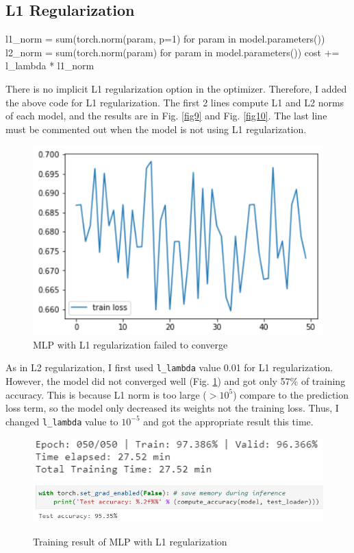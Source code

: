 \documentclass[11pt]{article}
\begin{document}
\subsection{L1 Regularization}\label{L1}
\begin{pythoncode*}{}
l1_norm = sum(torch.norm(param, p=1) for param in model.parameters())
l2_norm = sum(torch.norm(param) for param in model.parameters())
cost += l_lambda * l1_norm
\end{pythoncode*}
    There is no implicit L1 regularization option in the optimizer. Therefore, I added the above code for L1 regularization. The first 2 lines compute L1 and L2 norms of each model, and the results are in Fig. \ref{fig9} and Fig. \ref{fig10}. The last line must be commented out when the model is not using L1 regularization.
    \begin{figure}[H]\centering
        \includegraphics[width=0.7\linewidth]{img/L1/fail_loss.PNG}
        \caption{MLP with L1 regularization failed to converge}
        \label{fig7}
    \end{figure}
    As in L2 regularization, I first used \texttt{l\_lambda} value 0.01 for L1 regularization. However, the model did not converged well (Fig. \ref{fig7}) and got only 57\% of training accuracy. This is because L1 norm is too large ($>10^{5}$) compare to the prediction loss term, so the model only decreased its weights not the training loss. Thus, I changed \texttt{l\_lambda} value to $10^{-5}$ and got the appropriate result this time.
    \begin{figure}[H]
        \includegraphics[width=0.8\linewidth]{img/L1/final.PNG}
        \includegraphics[width=1\linewidth]{img/L1/test.PNG}
        \caption{Training result of MLP with L1 regularization}
        \label{fig8}
    \end{figure}
\end{document}
